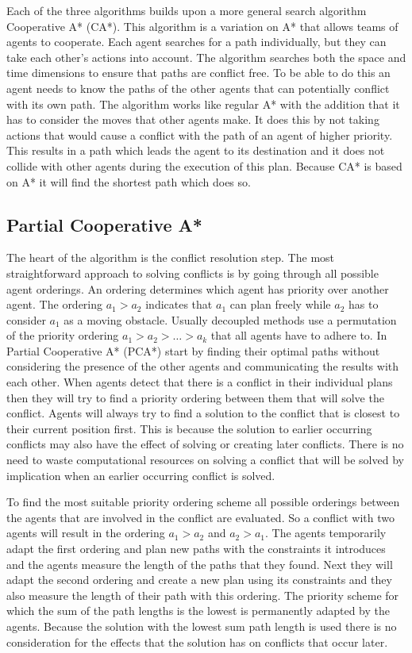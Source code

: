 Each of the three algorithms builds upon a more general search algorithm
Cooperative A* (CA*). This algorithm is a variation on A* \cite{hart1968} that
allows teams of agents to cooperate. Each agent searches for a path
individually, but they can take each other's actions into account. The
algorithm searches both the space and time dimensions to ensure that paths are
conflict free. To be able to do this an agent needs to know the paths of the
other agents that can potentially conflict with its own path. The algorithm
works like regular A* with the addition that it has to consider the moves that
other agents make. It does this by not taking actions that would cause a
conflict
with the path of an agent of higher priority. This results in a path which
leads the agent to its destination and it does not collide with other agents
during the execution of this plan. Because CA* is based on A* it will find the
shortest path which does so.

\subsection{Partial Cooperative A*}
The heart of the algorithm is the conflict resolution step. The most
straightforward approach to solving conflicts is by going through all possible
agent orderings. An ordering determines which agent has priority over another
agent. The ordering $a_1 > a_2$ indicates that $a_1$ can plan freely while
$a_2$ has to consider $a_1$ as a moving obstacle. Usually decoupled methods use
a permutation of the priority ordering $a_1 > a_2 > \ldots > a_k$ that all
agents have to adhere to. In Partial Cooperative A* (PCA*) start by finding
their optimal paths without considering the presence of the other agents and
communicating the results with each other. When agents detect that there is a
conflict in their individual plans then they will try to find a priority
ordering between them that will solve the conflict. Agents will always try to
find a solution to the conflict that is closest to their current position
first. This is because the solution to earlier occurring conflicts may also
have the effect of solving or creating later conflicts. There is no need to
waste computational resources on solving a conflict that will be solved by
implication when an earlier occurring conflict is solved.

To find the most suitable priority ordering scheme all possible orderings
between the agents that are involved in the conflict are evaluated. So a
conflict with two agents will result in the ordering $a_1 > a_2$ and $a_2 >
a_1$. The agents temporarily adapt the first ordering and plan new paths with
the constraints it introduces and the agents measure the length of the paths
that they found. Next they will adapt the second ordering and create a new plan
using its constraints and they also measure the length of their path with this
ordering. The priority scheme for which the sum of the path lengths is the
lowest is permanently adapted by the agents. Because the solution with the
lowest sum path length is used there is no consideration for the effects that
the solution has on conflicts that occur later.

